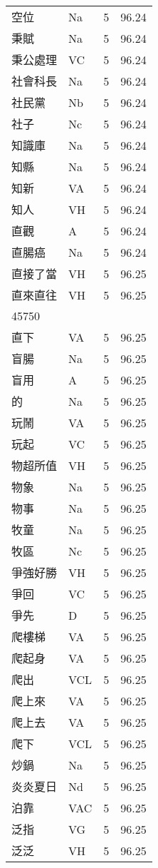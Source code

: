 \documentclass[twocolumn]{book}
\begin{document}
\begin{supertabular}{llrr}
空位 & Na & 5 &  96.24\\
秉賦 & Na & 5 &  96.24\\
秉公處理 & VC & 5 &  96.24\\
社會科長 & Na & 5 &  96.24\\
社民黨 & Nb & 5 &  96.24\\
社子 & Nc & 5 &  96.24\\
知識庫 & Na & 5 &  96.24\\
知縣 & Na & 5 &  96.24\\
知新 & VA & 5 &  96.24\\
知人 & VH & 5 &  96.24\\
直觀 & A & 5 &  96.24\\
直腸癌 & Na & 5 &  96.24\\
直接了當 & VH & 5 &  96.25\\
直來直往 & VH & 5 &  96.25\\
45750\\
直下 & VA & 5 &  96.25\\
盲腸 & Na & 5 &  96.25\\
盲用 & A & 5 &  96.25\\
的 & Na & 5 &  96.25\\
玩鬧 & VA & 5 &  96.25\\
玩起 & VC & 5 &  96.25\\
物超所值 & VH & 5 &  96.25\\
物象 & Na & 5 &  96.25\\
物事 & Na & 5 &  96.25\\
牧童 & Na & 5 &  96.25\\
牧區 & Nc & 5 &  96.25\\
爭強好勝 & VH & 5 &  96.25\\
爭回 & VC & 5 &  96.25\\
爭先 & D & 5 &  96.25\\
爬樓梯 & VA & 5 &  96.25\\
爬起身 & VA & 5 &  96.25\\
爬出 & VCL & 5 &  96.25\\
爬上來 & VA & 5 &  96.25\\
爬上去 & VA & 5 &  96.25\\
爬下 & VCL & 5 &  96.25\\
炒鍋 & Na & 5 &  96.25\\
炎炎夏日 & Nd & 5 &  96.25\\
泊靠 & VAC & 5 &  96.25\\
泛指 & VG & 5 &  96.25\\
泛泛 & VH & 5 &  96.25\\

\end{supertabular}
\end{document}
